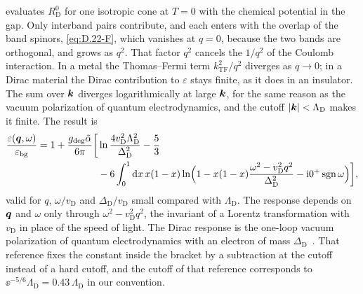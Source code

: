  evaluates $R^0_{\mathrm{D}}$ for one isotropic cone at $T = 0$ with the chemical potential in the gap. Only interband pairs contribute, and each enters with the overlap of the band spinors, \cref{eq:D.22-F}, which vanishes at $q = 0$, because the two bands are orthogonal, and grows as $q^2$. That factor $q^2$ cancels the $1/q^2$ of the Coulomb interaction. In a metal the Thomas--Fermi term $k_{\mathrm{TF}}^2/q^2$ diverges as $q \to 0$; in a Dirac material the Dirac contribution to $\varepsilon$ stays finite, as it does in an insulator. The sum over $\bm{k}$ diverges logarithmically at large $\bm{k}$, for the same reason as the vacuum polarization of quantum electrodynamics, and the cutoff $|\bm{k}| < \Lambda_{\mathrm{D}}$ makes it finite. The result is
\begin{equation}
  \begin{split}
  \frac{\varepsilon(\bm{q},\omega)}{\varepsilon_{\mathrm{bg}}} = 1 + \frac{g_{\mathrm{deg}}\tilde\alpha}{6\pi}\biggl[&\ln\frac{4v_{\mathrm{D}}^2\Lambda_{\mathrm{D}}^2}{\Delta_{\mathrm{D}}^2} - \frac53 \\
  &- 6\int_0^1\mathrm{d} x\,x(1 - x)\ln\Bigl(1 - x(1 - x)\frac{\omega^2 - v_{\mathrm{D}}^2q^2}{\Delta_{\mathrm{D}}^2} - \mathrm{i}0^+\operatorname{sgn}\omega\Bigr)\biggr] ,
  \end{split}
  \label{eq:7.3-eps}
\end{equation}
valid for $q$, $\omega/v_{\mathrm{D}}$ and $\Delta_{\mathrm{D}}/v_{\mathrm{D}}$ small compared with $\Lambda_{\mathrm{D}}$. The response depends on $\bm{q}$ and $\omega$ only through $\omega^2 - v_{\mathrm{D}}^2q^2$, the invariant of a Lorentz transformation with $v_{\mathrm{D}}$ in place of the speed of light. The Dirac response is the one-loop vacuum polarization of quantum electrodynamics with an electron of mass $\Delta_{\mathrm{D}}$~\cite[Eq.~(2.6)]{hochberg2018detection}. That reference fixes the constant inside the bracket by a subtraction at the cutoff instead of a hard cutoff, and the cutoff of that reference corresponds to $\ee^{-5/6}\Lambda_{\mathrm{D}} = 0.43\,\Lambda_{\mathrm{D}}$ in our convention.

